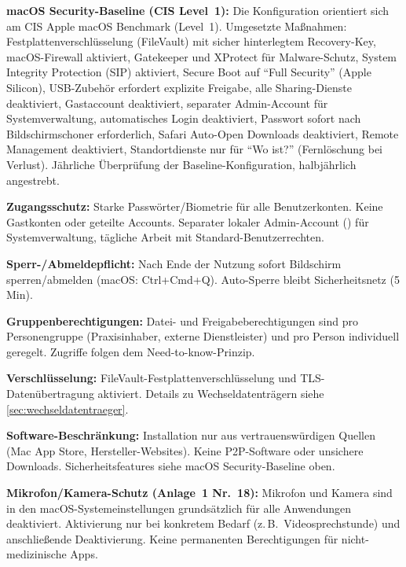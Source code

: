 \textbf{macOS Security-Baseline (CIS Level~1):} Die Konfiguration orientiert sich am
CIS Apple macOS Benchmark (Level~1). Umgesetzte Maßnahmen: Festplattenverschlüsselung
(FileVault) mit sicher hinterlegtem Recovery-Key, macOS-Firewall aktiviert, Gatekeeper
und XProtect für Malware-Schutz, System Integrity Protection (SIP) aktiviert, Secure Boot
auf \enquote{Full Security} (Apple Silicon), USB-Zubehör erfordert explizite Freigabe,
alle Sharing-Dienste deaktiviert, Gastaccount deaktiviert, separater Admin-Account für
Systemverwaltung, automatisches Login deaktiviert, Passwort sofort nach Bildschirmschoner
erforderlich, Safari Auto-Open Downloads deaktiviert, Remote Management deaktiviert,
Standortdienste nur für \enquote{Wo ist?} (Fernlöschung bei Verlust).
Jährliche Überprüfung der Baseline-Konfiguration, halbjährlich angestrebt.

\textbf{Zugangsschutz:} Starke Passwörter/Biometrie für alle Benutzerkonten. Keine
Gastkonten oder geteilte Accounts. Separater lokaler Admin-Account (\texttt{\AdminUser{}}) für
Systemverwaltung, tägliche Arbeit mit Standard-Benutzerrechten.

\textbf{Sperr-/Abmeldepflicht:} Nach Ende der Nutzung sofort Bildschirm sperren/abmelden
(macOS: Ctrl+Cmd+Q). Auto-Sperre bleibt Sicherheitsnetz (5 Min).

\textbf{Gruppenberechtigungen:} Datei- und Freigabeberechtigungen sind pro Personengruppe
(Praxisinhaber, externe Dienstleister) und pro Person individuell geregelt. Zugriffe
folgen dem Need-to-know-Prinzip.

\textbf{Verschlüsselung:} FileVault-Festplattenverschlüsselung und TLS-Datenübertragung
aktiviert. Details zu Wechseldatenträgern siehe \cref{sec:wechseldatentraeger}.

\textbf{Software-Beschränkung:} Installation nur aus vertrauenswürdigen Quellen (Mac App
Store, Hersteller-Websites). Keine P2P-Software oder unsichere Downloads.
Sicherheitsfeatures siehe macOS Security-Baseline oben.

\textbf{Mikrofon/Kamera-Schutz (Anlage~1 Nr.~18):} Mikrofon und Kamera sind in den
macOS-Systemeinstellungen grundsätzlich für alle Anwendungen deaktiviert. Aktivierung nur
bei konkretem Bedarf (z.\,B.\ Videosprechstunde) und anschließende Deaktivierung. Keine
permanenten Berechtigungen für nicht-medizinische Apps.


